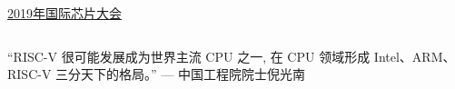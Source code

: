 
\begin{frame}{}
  \begin{center}
    \href{https://www.benchcouncil.org/conferences/ficc/2019/chips19/chips19.html}{2019年国际芯片大会}
  \end{center}
  \begin{columns}
  \end{columns}

  \vspace{0.60cm}
  \begin{center}
    ``RISC-V 很可能发展成为世界主流 CPU 之一,
    在 CPU 领域形成 Intel、ARM、RISC-V 三分天下的格局。''
    \hfill --- 中国工程院院士\quad 倪光南
  \end{center}
\end{frame}
